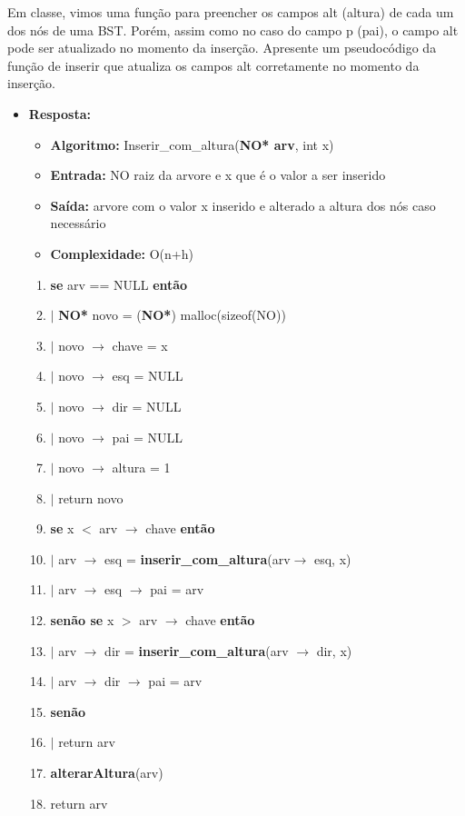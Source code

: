 Em classe, vimos uma função para preencher os campos alt (altura) de cada um dos nós de
uma BST. Porém, assim como no caso do campo p (pai), o campo alt pode ser atualizado no
momento da inserção. Apresente um pseudocódigo da função de inserir que atualiza os campos
alt corretamente no momento da inserção.

\begin{itemize}
	\item \textbf{Resposta:}
	
	\begin{itemize}
		\item \textbf{Algoritmo:} Inserir\_com\_altura(\textbf{NO* arv}, int x)
		\item \textbf{Entrada:} NO raiz da arvore e x que é o valor a ser inserido
		\item \textbf{Saída:}
		arvore com o valor x inserido e alterado a altura dos nós caso necessário
		\item \textbf{Complexidade:} O(n+h)
		
	\end{itemize}
	
	 
	 
	 \begin{enumerate}[1--]
	 	\item \textbf{se} arv == NULL \textbf{então}
	 	\item $|$ \quad
	 	\textbf{NO*} novo = (\textbf{NO*}) malloc(sizeof(NO))
	 	\item $|$ \quad
	 	novo $\rightarrow$ chave = x
	 	\item $|$ \quad
	 	novo $\rightarrow$ esq = NULL
	 	\item $|$ \quad
	 	novo $\rightarrow$ dir = NULL
	 	\item $|$ \quad
	 	novo $\rightarrow$ pai = NULL
	 	\item $|$ \quad
	 	novo $\rightarrow$ altura = 1
	 	\item $|$ \quad
	 	return novo
	 	\item \textbf{se} x $<$ arv $\rightarrow$ chave \textbf{então}
	 	\item $|$ \quad
	 	arv $\rightarrow$ esq = \textbf{inserir\_com\_altura}(arv$\rightarrow$ esq, x)
	 	\item $|$ \quad
	 	arv $\rightarrow$ esq $\rightarrow$ pai = arv
	 	\item \textbf{senão se} x $>$ arv $\rightarrow$ chave \textbf{então}
	 	\item $|$ \quad
	 	arv $\rightarrow$ dir = \textbf{inserir\_com\_altura}(arv $\rightarrow$ dir, x)
	 	\item $|$ \quad
	 	arv $\rightarrow$ dir $\rightarrow$ pai = arv
	 	\item \textbf{senão}
	 	\item $|$ \quad
	 	return arv
	 	\item \textbf{alterarAltura}(arv)
	 	\item return arv
	 \end{enumerate}
	 

\end{itemize}
